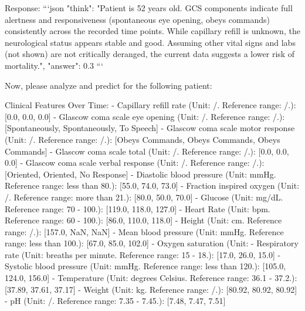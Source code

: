 \begin{tcolorbox}
\begin{VerbatimWrap}
Response:
```json { "think": "Patient is 52 years old. GCS components indicate full alertness and responsiveness (spontaneous eye opening, obeys commands) consistently across the recorded time points. While capillary refill is unknown, the neurological status appears stable and good. Assuming other vital signs and labs (not shown) are not critically deranged, the current data suggests a lower risk of mortality.", "answer": 0.3 } ```

Now, please analyze and predict for the following patient:

Clinical Features Over Time:
- Capillary refill rate (Unit: /. Reference range: /.): [0.0, 0.0, 0.0]
- Glascow coma scale eye opening (Unit: /. Reference range: /.): [Spontaneously, Spontaneously, To Speech]
- Glascow coma scale motor response (Unit: /. Reference range: /.): [Obeys Commands, Obeys Commands, Obeys Commands]
- Glascow coma scale total (Unit: /. Reference range: /.): [0.0, 0.0, 0.0]
- Glascow coma scale verbal response (Unit: /. Reference range: /.): [Oriented, Oriented, No Response]
- Diastolic blood pressure (Unit: mmHg. Reference range: less than 80.): [55.0, 74.0, 73.0]
- Fraction inspired oxygen (Unit: /. Reference range: more than 21.): [80.0, 50.0, 70.0]
- Glucose (Unit: mg/dL. Reference range: 70 - 100.): [119.0, 118.0, 127.0]
- Heart Rate (Unit: bpm. Reference range: 60 - 100.): [86.0, 110.0, 118.0]
- Height (Unit: cm. Reference range: /.): [157.0, NaN, NaN]
- Mean blood pressure (Unit: mmHg. Reference range: less than 100.): [67.0, 85.0, 102.0]
- Oxygen saturation (Unit: %
- Respiratory rate (Unit: breaths per minute. Reference range: 15 - 18.): [17.0, 26.0, 15.0]
- Systolic blood pressure (Unit: mmHg. Reference range: less than 120.): [105.0, 124.0, 156.0]
- Temperature (Unit: degrees Celsius. Reference range: 36.1 - 37.2.): [37.89, 37.61, 37.17]
- Weight (Unit: kg. Reference range: /.): [80.92, 80.92, 80.92]
- pH (Unit: /. Reference range: 7.35 - 7.45.): [7.48, 7.47, 7.51]
\end{VerbatimWrap}
\end{tcolorbox}




